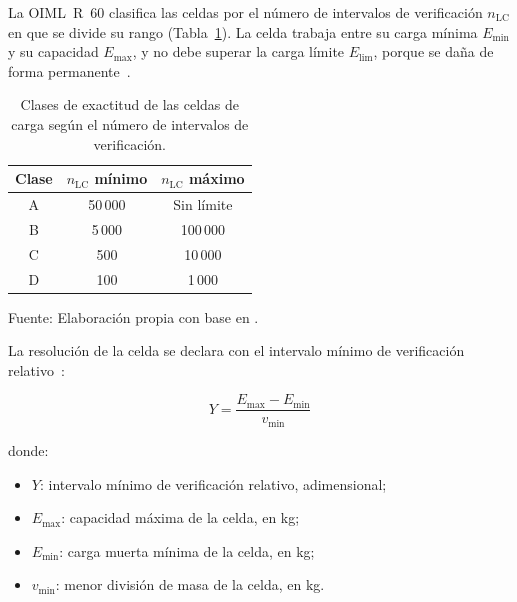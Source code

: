 La OIML~R~60 clasifica las celdas por el número de intervalos de verificación
$n_{\mathrm{LC}}$ en que se divide su rango (Tabla~\ref{tab:clases_celda}).
La celda trabaja entre su carga mínima $E_{\min}$ y su capacidad $E_{\max}$,
y no debe superar la carga límite $E_{\lim}$, porque se daña de forma
permanente~\parencite{oiml2017r60}.

\begin{table}[H]
    \centering
    \caption{Clases de exactitud de las celdas de carga según el número de intervalos de verificación.}
    \label{tab:clases_celda}
    \footnotesize
    \renewcommand{\arraystretch}{1.25}

    \begin{tabular}{ccc}
        \toprule[1pt]
        \textbf{Clase} & \textbf{$n_{\mathrm{LC}}$ mínimo} & \textbf{$n_{\mathrm{LC}}$ máximo} \\
        \midrule[1pt]
        A & 50\,000 & Sin límite \\
        B & 5\,000 & 100\,000 \\
        C & 500 & 10\,000 \\
        D & 100 & 1\,000 \\
        \bottomrule[1pt]
    \end{tabular}

    \vspace{2pt}
    {\footnotesize Fuente: Elaboración propia con base en \textcite{oiml2017r60}.}
\end{table}

La resolución de la celda se declara con el intervalo mínimo de verificación
relativo~\parencite{oiml2017r60}:

\begin{equation}
    Y = \frac{E_{\max} - E_{\min}}{v_{\min}}
    \label{eq:intervalo_relativo}
\end{equation}

\noindent donde:

\begin{itemize}[nosep, label={}, leftmargin=1.5em]
    \item $Y$: intervalo mínimo de verificación relativo, adimensional;
    \item $E_{\max}$: capacidad máxima de la celda, en kg;
    \item $E_{\min}$: carga muerta mínima de la celda, en kg;
    \item $v_{\min}$: menor división de masa de la celda, en kg.
\end{itemize}

